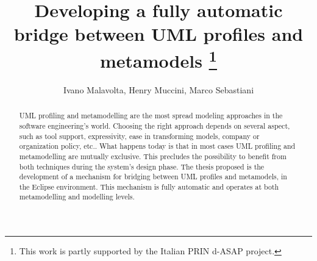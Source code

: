 \documentclass[orivec]{llncs}
\newcommand\ivano[1]{\nb{Ivano}{#1}}
\begin{document}
\title{{Developing a fully automatic bridge between UML profiles and metamodels}
\thanks{This work is partly supported by the Italian PRIN d-ASAP project.}}


\author{Ivano Malavolta, Henry Muccini, Marco Sebastiani}

\maketitle

\begin{abstract}
\ivano{abstract}
UML profiling and metamodelling are the most spread modeling approaches in the software engineering's world. Choosing the right approach depends on several aspect, such as tool support, expressivity, ease in transforming models, company or organization policy, etc.. What happens today is that in most cases UML profiling and metamodelling are mutually exclusive. This precludes the possibility to benefit from both techniques during the system's design phase.
The thesis proposed is the development of a mechanism for bridging between UML profiles and metamodels, in the Eclipse environment. This mechanism is fully automatic and operates at both metamodelling and modelling levels.
\end{abstract}














%
\end{document}
